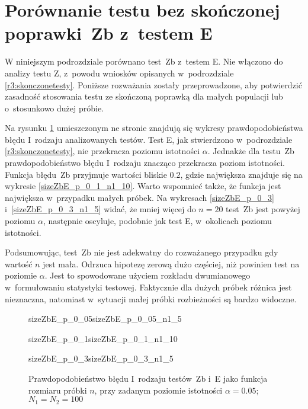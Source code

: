 \newpage

\section{Porównanie testu bez skończonej poprawki~Zb z~testem E}

W niniejszym podrozdziale porównano test~Zb z~testem E. Nie włączono do analizy testu Z, z~powodu wniosków opisanych w~podrozdziale \ref{r3:skonczonetesty}. Poniższe rozważania zostały przeprowadzone, aby potwierdzić zasadność stosowania testu ze skończoną poprawką dla małych populacji lub o~stosunkowo dużej próbie.

Na rysunku \ref{sizeZbE_n} umieszczonym ne stronie \pageref{sizeZbE_n} znajdują się wykresy prawdopodobieństwa błędu I~rodzaju analizowanych testów. Test E, jak stwierdzono w~podrozdziale \ref{r3:skonczonetesty}, nie przekracza poziomu istotności $\alpha$. Jednakże dla testu~Zb prawdopodobieństwo błędu I~rodzaju znacząco przekracza poziom istotności. Funkcja błędu~Zb przyjmuje wartości bliskie $0.2$, gdzie największa znajduje się na wykresie \ref{sizeZbE_p_0_1_n1_10}. Warto wspomnieć także, że funkcja jest największa w~przypadku małych próbek. Na wykresach \ref{sizeZbE_p_0_3} i~\ref{sizeZbE_p_0_3_n1_5} widać, że mniej więcej do $n=20$ test~Zb jest powyżej poziomu $\alpha$, następnie oscyluje, podobnie jak test E, w~okolicach poziomu istotności. 

Podsumowując, test~Zb nie jest adekwatny do rozważanego przypadku gdy wartość $n$ jest mała. Odrzuca hipotezę zerową dużo częściej, niż powinien test na poziomie $\alpha$. Jest to spowodowane użyciem rozkładu dwumianowego w~formułowaniu statystyki testowej. Faktycznie dla dużych próbek różnica jest nieznaczna, natomiast w~sytuacji małej próbki rozbieżności są bardzo widoczne.

\begin{figure}[!h]
	\begin{subdiagrams}{sizeZbE_p_0_05}{sizeZbE_p_0_05_n1_5}
	\end{subdiagrams}
	
	\begin{subdiagrams}{sizeZbE_p_0_1}{sizeZbE_p_0_1_n1_10}
	\end{subdiagrams}
	
	\begin{subdiagrams}{sizeZbE_p_0_3}{sizeZbE_p_0_3_n1_5}
	\end{subdiagrams}
	\caption{Prawdopodobieństwo błędu I~rodzaju testów~Zb i~E jako funkcja rozmiaru próbki $n$, przy zadanym poziomie istotności $\alpha=0.05$; $N_1=N_2=100$}
	\label{sizeZbE_n}
\end{figure}

